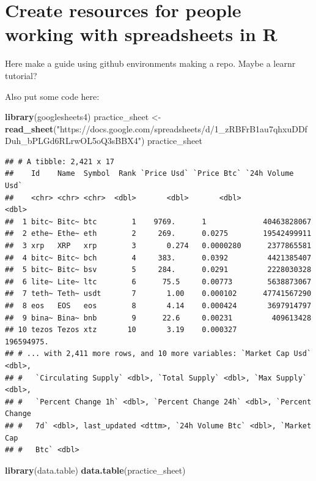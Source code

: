\documentclass[
]{book}
\newenvironment{Shaded}{\begin{snugshade}}{\end{snugshade}}
\newcommand{\KeywordTok}[1]{\textcolor[rgb]{0.13,0.29,0.53}{\textbf{#1}}}
\newcommand{\NormalTok}[1]{#1}
\newcommand{\StringTok}[1]{\textcolor[rgb]{0.31,0.60,0.02}{#1}}
\begin{document}
\hypertarget{create-resources-for-people-working-with-spreadsheets-in-r}{%
\section{Create resources for people working with spreadsheets in R}\label{create-resources-for-people-working-with-spreadsheets-in-r}}

Here make a guide using github environments making a repo. Maybe a learnr tutorial?

Also put some code here:

\begin{Shaded}
\begin{Highlighting}[]
\KeywordTok{library}\NormalTok{(googlesheets4)}
\NormalTok{practice_sheet <-}\StringTok{ }\KeywordTok{read_sheet}\NormalTok{(}\StringTok{"https://docs.google.com/spreadsheets/d/1_zRBFrB1au7qhxuDDfDuh_bPLGd6RLrwOL5oQ3sBBX4"}\NormalTok{)}
\NormalTok{practice_sheet}
\end{Highlighting}
\end{Shaded}

\begin{verbatim}
## # A tibble: 2,421 x 17
##    Id    Name  Symbol  Rank `Price Usd` `Price Btc` `24h Volume Usd`
##    <chr> <chr> <chr>  <dbl>       <dbl>       <dbl>            <dbl>
##  1 bitc~ Bitc~ btc        1    9769.      1             40463828067 
##  2 ethe~ Ethe~ eth        2     269.      0.0275        19542499911 
##  3 xrp   XRP   xrp        3       0.274   0.0000280      2377865581 
##  4 bitc~ Bitc~ bch        4     383.      0.0392         4421385407 
##  5 bitc~ Bitc~ bsv        5     284.      0.0291         2228030328 
##  6 lite~ Lite~ ltc        6      75.5     0.00773        5638873067 
##  7 teth~ Teth~ usdt       7       1.00    0.000102      47741567290 
##  8 eos   EOS   eos        8       4.14    0.000424       3697914797 
##  9 bina~ Bina~ bnb        9      22.6     0.00231         409613428 
## 10 tezos Tezos xtz       10       3.19    0.000327        196594975.
## # ... with 2,411 more rows, and 10 more variables: `Market Cap Usd` <dbl>,
## #   `Circulating Supply` <dbl>, `Total Supply` <dbl>, `Max Supply` <dbl>,
## #   `Percent Change 1h` <dbl>, `Percent Change 24h` <dbl>, `Percent Change
## #   7d` <dbl>, last_updated <dttm>, `24h Volume Btc` <dbl>, `Market Cap
## #   Btc` <dbl>
\end{verbatim}

\begin{Shaded}
\begin{Highlighting}[]
\KeywordTok{library}\NormalTok{(data.table)}
\KeywordTok{data.table}\NormalTok{(practice_sheet)}
\end{Highlighting}
\end{Shaded}
\end{document}
